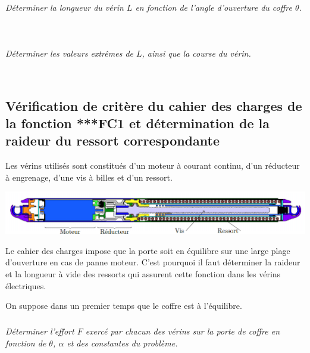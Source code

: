 \documentclass[10pt,fleqn]{article} %
\begin{document}
\begin{multicols}{2}
\begin{multicols}{2}
\begin{corrige}
\end{corrige}
\else
\fi


\subparagraph{}
\textit{Déterminer la longueur du vérin $L$ en fonction de l’angle d’ouverture du coffre $\theta$.}
\ifprof
\begin{corrige}~\\

\end{corrige}
\else
\fi

\subparagraph{}
\textit{Déterminer les valeurs extrêmes de $L$, ainsi que la course du vérin.}
\ifprof
\begin{corrige}~\\

\end{corrige}
\else
\fi


\subsection*{Vérification de critère du cahier des charges de la fonction ***FC1 et détermination de la
raideur du ressort correspondante}

Les vérins utilisés sont constitués d’un moteur à courant continu, d’un réducteur à engrenage, d’une vis à billes et d’un ressort.

\begin{center}
\includegraphics[width=\linewidth]{images/fig_02}
\end{center}

Le cahier des charges impose que la porte soit en équilibre sur une large plage d’ouverture en cas de panne
moteur. C’est pourquoi il faut déterminer la raideur et la longueur à vide des ressorts qui assurent cette fonction
dans les vérins électriques.

On suppose dans un premier temps que le coffre est à l’équilibre.

\subparagraph{}
\textit{Déterminer l’effort $F$ exercé par chacun des vérins sur la porte de coffre en fonction de $\theta$, $\alpha$ et des constantes du problème.}
\ifprof
\begin{corrige}~\\


\end{corrige}
\end{multicols}
\end{multicols}
\end{document}
